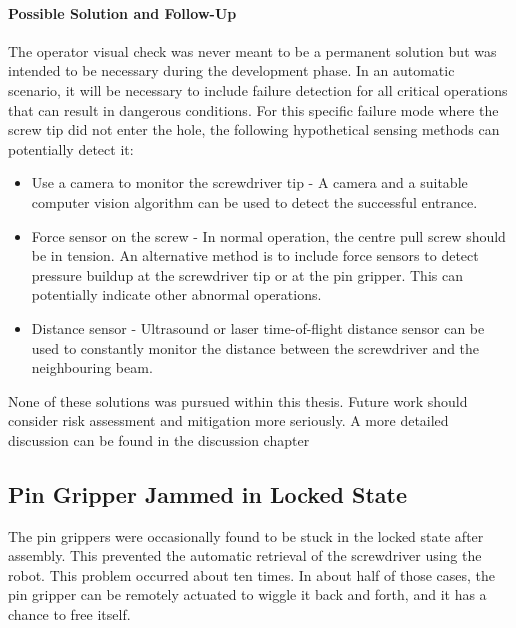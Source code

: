 \paragraph{Possible Solution and Follow-Up}
The operator visual check was never meant to be a permanent solution but was intended to be necessary during the development phase. In an automatic scenario, it will be necessary to include failure detection for all critical operations that can result in dangerous conditions. For this specific failure mode where the screw tip did not enter the hole, the following hypothetical sensing methods can potentially detect it:

\begin{itemize}
    \item Use a camera to monitor the screwdriver tip - A camera and a suitable computer vision algorithm can be used to detect the successful entrance.
    \item Force sensor on the screw - In normal operation, the centre pull screw should be in tension. An alternative method is to include force sensors to detect pressure buildup at the screwdriver tip or at the pin gripper. This can potentially indicate other abnormal operations.
    \item Distance sensor - Ultrasound or laser time-of-flight distance sensor can be used to constantly monitor the distance between the screwdriver and the neighbouring beam.

\end{itemize}
None of these solutions was pursued within this thesis. Future work should consider risk assessment and mitigation more seriously. A more detailed discussion can be found in the discussion chapter 

\subsection{Pin Gripper Jammed in Locked State}
\label{subsection:exploration_4_pin_gripper_jammed_in_locked_state}

The pin grippers were occasionally found to be stuck in the locked state after assembly. This prevented the automatic retrieval of the screwdriver using the robot. This problem occurred about ten times. In about half of those cases, the pin gripper can be remotely actuated to wiggle it back and forth, and it has a chance to free itself.

